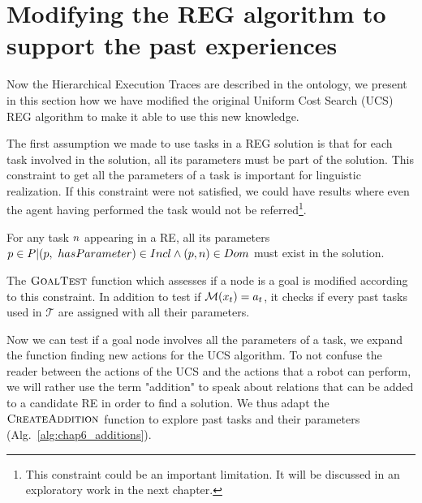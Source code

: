 \section[REG algorithm modifications]{Modifying the REG algorithm to support the past experiences}

Now the Hierarchical Execution Traces are described in the ontology, we present in this section how we have modified the original Uniform Cost Search (UCS) REG algorithm to make it able to use this new knowledge.

The first assumption we made to use tasks in a REG solution is that for each task involved in the solution, all its parameters must be part of the solution. This constraint to get all the parameters of a task is important for linguistic realization. If this constraint were not satisfied, we could have results where even the agent having performed the task would not be referred\footnote{This constraint could be an important limitation. It will be discussed in an exploratory work in the next chapter.}.

\begin{theorem} 
\label{the:complete_intance}
For any task $n$ appearing in a RE, all its parameters $p \in P | (p,\ hasParameter) \in Incl \wedge (p, n) \in Dom$ must exist in the solution.
\end{theorem}

The $\textsc{GoalTest}$ function which assesses if a node is a goal is modified according to this constraint. In addition to test if $\mathcal{M}(x_t) = a_t$, it checks if every past tasks used in $\mathcal{T}$ are assigned with all their parameters.

Now we can test if a goal node involves all the parameters of a task, we expand the function finding new actions for the UCS algorithm. To not confuse the reader between the actions of the UCS and the actions that a robot can perform, we will rather use the term "addition" to speak about relations that can be added to a candidate RE in order to find a solution. We thus adapt the $\textsc{CreateAddition}$ function to explore past tasks and their parameters (Alg.~\ref{alg:chap6_additions}).

